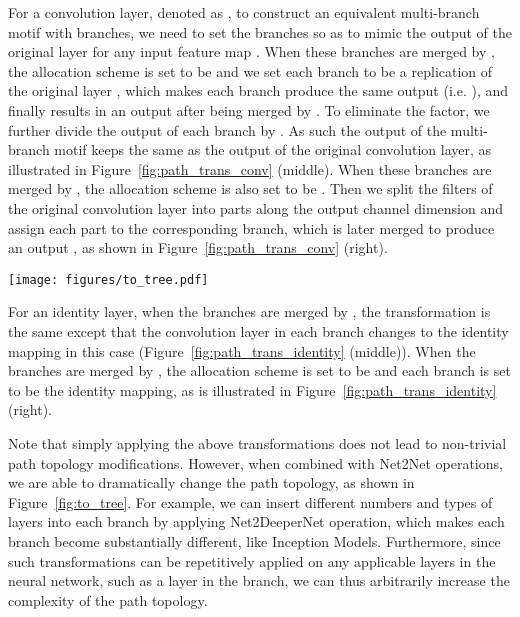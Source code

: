 \documentclass{article}
\begin{document}
For a convolution layer, denoted as , to construct an equivalent multi-branch motif with  branches, we need to set the branches so as to mimic the output of the original layer for any input feature map . When these branches are merged by , the allocation scheme is set to be  and we set each branch to be a replication of the original layer , which makes each branch produce the same output (i.e. ), and finally results in an output  after being merged by . To eliminate the factor, we further divide the output of each branch by . As such the output of the multi-branch motif keeps the same as the output of the original convolution layer, as illustrated in Figure~\ref{fig:path_trans_conv} (middle).
When these branches are merged by , the allocation scheme is also set to be . Then we split the filters of the original convolution layer into  parts along the output channel dimension and assign each part to the corresponding branch, which is later merged to produce an output , as shown in Figure~\ref{fig:path_trans_conv} (right).

\begin{figure*}[t]
	\centering
	\texttt{[image: figures/to\_tree.pdf]}
    \vspace{-10pt}
	\caption{An illustration of transforming a single layer to a tree-structured motif via path-level transformation operations, where we apply Net2DeeperNet operation to replace an identity mapping with a  depthwise-separable convolution in (c). }\label{fig:to_tree}
\end{figure*}

For an identity layer, when the branches are merged by , the transformation is the same except that the convolution layer in each branch changes to the identity mapping in this case (Figure~\ref{fig:path_trans_identity} (middle)). When the branches are merged by , the allocation scheme is set to be  and each branch is set to be the identity mapping, as is illustrated in Figure~\ref{fig:path_trans_identity} (right).

Note that simply applying the above transformations does not lead to non-trivial path topology modifications. However, when combined with Net2Net operations, we are able to dramatically change the path topology, as shown in Figure~\ref{fig:to_tree}. For example, we can insert different numbers and types of layers into each branch by applying Net2DeeperNet operation, which makes each branch become substantially different, like Inception Models. Furthermore, since such transformations can be repetitively applied on any applicable layers in the neural network, such as a layer in the branch, we can thus arbitrarily increase the complexity of the path topology.
\end{document}
